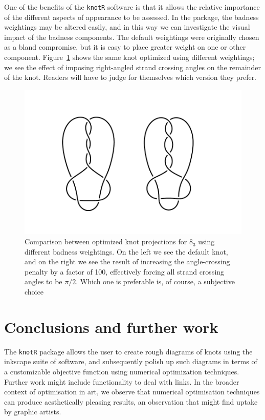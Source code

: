 \documentclass{birkjour}
\theoremstyle{definition}
\theoremstyle{remark}
\numberwithin{equation}{section}
\begin{document}
One of the benefits of the {\tt knotR} software is that it allows the
relative importance of the different aspects of appearance to be
assessed.  In the package, the badness weightings may be altered
easily, and in this way we can investigate the visual impact of the
badness components.  The default weightings were originally chosen as
a bland compromise, but it is easy to place greater weight on one or
other component.  Figure~\ref{figure_cca} shows the same knot optimized
using different weightings; we see the effect of imposing right-angled
strand crossing angles on the remainder of the knot.  Readers will
have to judge for themselves which version they prefer.

\begin{figure}[htbp]
  \begin{center}
\includegraphics[width=13cm]{compare_crossing_angles}  %
\caption{Comparison between optimized knot projections for $8_3$
  \label{figure_cca} using different  badness weightings.  On the
  left we see the default knot, and on the right we see the result of
  increasing the angle-crossing penalty by a factor of 100,
  effectively forcing all strand crossing angles to be $\pi/2$.  Which
  one is preferable is, of course, a subjective choice}
  \end{center}
\end{figure}


\section{Conclusions and further work}

The {\tt knotR} package allows the user to create rough diagrams of
knots using the inkscape suite of software, and subsequently polish up
such diagrams in terms of a customizable objective function using
numerical optimization techniques.  Further work might include
functionality to deal with links.  In the broader context of
optimisation in art, we observe that numerical optimisation techniques
can produce aesthetically pleasing results, an observation that might
find uptake by graphic artists.
\end{document}
